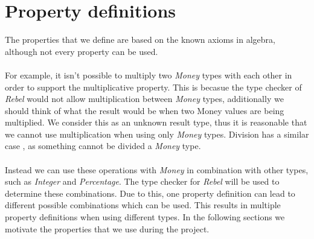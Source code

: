 \section{Property definitions}
\label{sct:properties_property_definitions}
The properties that we define are based on the known axioms in algebra, although
not every property can be used.\\
\\
For example, it isn't possible to multiply two
\textit{Money} types with each other in order to support the multiplicative
property. This is becasue the type checker of \textit{Rebel} would not allow
multiplication between \textit{Money} types, additionally we should think of
what the result would be when two Money values are being multiplied. We consider
this as an unknown result type, thus it is reasonable that we cannot use
multiplication when using only \textit{Money} types. Division has a similar case
, as something cannot be divided a \textit{Money} type.\\
\\
Instead we can use these operations with \textit{Money} in combination with
other types, such as \textit{Integer} and \textit{Percentage}. The type checker
for \textit{Rebel} will be used to determine these combinations. Due to this,
one property definition can lead to different possible combinations which can be
used. This results in multiple property definitions when using different types.
In the following sections we motivate the properties that we use during the
project.
